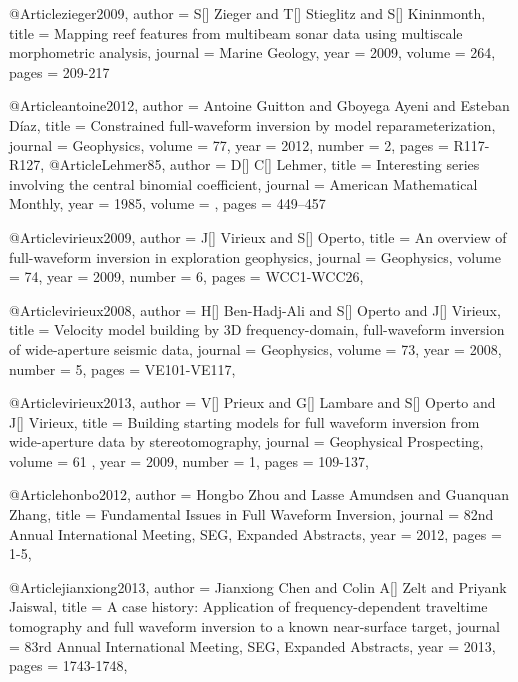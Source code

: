              @Article{zieger2009,
  author = 	 {S[] Zieger and T[] Stieglitz and S[] Kininmonth},
  title = 	 {Mapping reef features from multibeam sonar data using multiscale morphometric analysis},
  journal = 	 {Marine Geology},
  year = 	 2009,
  volume = 	 264,
  pages = 	 {209-217}}   
  
@Article{antoine2012,
  author =	 { Antoine Guitton and Gboyega Ayeni and Esteban Díaz},
  title =	 {Constrained full-waveform inversion by model reparameterization},
  journal =	 {Geophysics},
  volume =	 77,
  year =	 2012,
  number =	 2,
  pages =	 {R117-R127},
}
@Article{Lehmer85,
  author = 	 {D[] C[] Lehmer},
  title = 	 {Interesting series involving the central binomial coefficient},
  journal = 	 {American Mathematical Monthly},
  year = 	 1985,
  volume =	 ,
  pages =	 {449–457}
}

@Article{virieux2009,
  author =	 { J[] Virieux and S[] Operto},
  title =	 {An overview of full-waveform inversion in exploration geophysics},
  journal =	 {Geophysics},
  volume =	 74,
  year =	 2009,
  number =	 6,
  pages =	 {WCC1-WCC26},
}

@Article{virieux2008,
  author =	 { H[] Ben-Hadj-Ali and S[] Operto and J[] Virieux},
  title =	 {Velocity model building by 3{D} frequency-domain, full-waveform inversion of wide-aperture seismic data},
  journal =	 {Geophysics},
  volume =	 73,
  year =	 2008,
  number =	 5,
  pages =	 {VE101-VE117},
}

@Article{virieux2013,
  author =	 { V[] Prieux and G[] Lambare  and S[] Operto and J[] Virieux},
  title =	 {Building starting models for full waveform inversion from wide-aperture data by stereotomography},
  journal =	 {Geophysical Prospecting},
  volume =	61 ,
  year =	 2009,
  number =	 1,
  pages =	 {109-137},
}



@Article{honbo2012,
  author = 	 {Hongbo Zhou and Lasse Amundsen and Guanquan Zhang},
  title = 	 {Fundamental Issues in Full Waveform Inversion},
  journal = 	 {82nd Annual International Meeting, SEG, Expanded Abstracts},
  year = 	 2012,
  pages =	 {1-5},
}

@Article{jianxiong2013,
  author = 	 {Jianxiong Chen and Colin A[] Zelt and Priyank Jaiswal},
  title = 	 {A case history: Application of frequency-dependent traveltime tomography and full waveform
inversion to a known near-surface target},
  journal = 	 {83rd Annual International Meeting, SEG, Expanded Abstracts},
  year = 	 2013,
  pages =	 {1743-1748},
}

